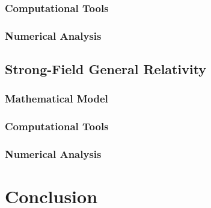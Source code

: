 \documentclass{report}
\begin{document}
        \subsection{Computational Tools}

        \subsection{Numerical Analysis}

    \section{Strong-Field General Relativity}

        \subsection{Mathematical Model}

        \subsection{Computational Tools}

        \subsection{Numerical Analysis}

\chapter{Conclusion}

\printbibliography

\printindex
\end{document}
